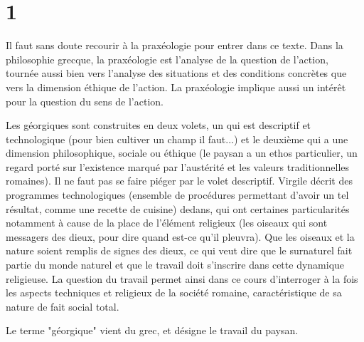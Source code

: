 \documentclass[a4paper,12pt]{book}
\begin{document}
\section{1}
Il faut sans doute recourir à la praxéologie pour entrer dans ce texte. Dans la philosophie grecque, la praxéologie est l'analyse de la question de l'action, tournée aussi bien vers l'analyse des situations et des conditions concrètes que vers la dimension éthique de l'action. La praxéologie implique aussi un intérêt pour la question du sens de l'action.
\par Les géorgiques sont construites en deux volets, un qui est descriptif et technologique (pour bien cultiver un champ il faut...) et le deuxième qui a une dimension philosophique, sociale ou éthique (le paysan a un ethos particulier, un regard porté sur l'existence marqué par l'austérité et les valeurs traditionnelles romaines). Il ne faut pas se faire piéger par le volet descriptif. Virgile décrit des programmes technologiques (ensemble de procédures permettant d'avoir un tel résultat, comme une recette de cuisine) dedans, qui ont certaines particularités notamment à cause de la place de l'élément religieux (les oiseaux qui sont messagers des dieux, pour dire quand est-ce qu'il pleuvra). Que les oiseaux et la nature soient remplis de signes des dieux, ce qui veut dire que le surnaturel fait partie du monde naturel et que le travail doit s'inscrire dans cette dynamique religieuse. La question du travail permet ainsi dans ce cours d'interroger à la fois les aspects techniques et religieux de la société romaine, caractéristique de sa nature de fait social total.
\par Le terme "géorgique" vient du grec, et désigne le travail du paysan.
\end{document}
